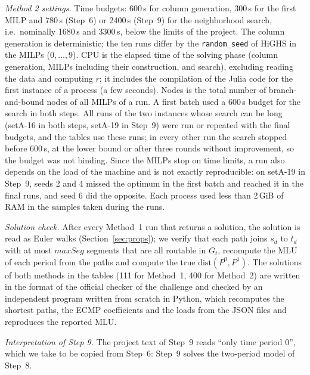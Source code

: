 \documentclass[conference]{IEEEtran}
\begin{document}
\emph{Method 2 settings.} Time budgets: 600\,s for column generation, 300\,s for the first MILP and 780\,s (Step~6) or 2400\,s (Step~9) for the neighborhood search, i.e.\ nominally 1680\,s and 3300\,s, below the limits of the project. The column generation is deterministic; the ten runs differ by the \texttt{random\_seed} of HiGHS in the MILPs ($0,\dots,9$). CPU is the elapsed time of the solving phase (column generation, MILPs including their construction, and search), excluding reading the data and computing $r$; it includes the compilation of the Julia code for the first instance of a process (a few seconds). Nodes is the total number of branch-and-bound nodes of all MILPs of a run. A first batch used a 600\,s budget for the search in both steps. All runs of the two instances whose search can be long (setA-16 in both steps, setA-19 in Step~9) were run or repeated with the final budgets, and the tables use these runs; in every other run the search stopped before 600\,s, at the lower bound or after three rounds without improvement, so the budget was not binding. Since the MILPs stop on time limits, a run also depends on the load of the machine and is not exactly reproducible: on setA-19 in Step~9, seeds 2 and 4 missed the optimum in the first batch and reached it in the final runs, and seed 6 did the opposite. Each process used less than 2\,GiB of RAM in the samples taken during the runs.

\emph{Solution check.} After every Method~1 run that returns a solution, the solution is read as Euler walks (Section~\ref{sec:props}); we verify that each path joins $s_d$ to $t_d$ with at most $maxSeg$ segments that are all routable in $G_t$, recompute the MLU of each period from the paths and compute the true $\mathrm{dist}(P^0,P^1)$. The solutions of both methods in the tables (111 for Method~1, 400 for Method~2) are written in the format of the official checker of the challenge and checked by an independent program written from scratch in Python, which recomputes the shortest paths, the ECMP coefficients and the loads from the JSON files and reproduces the reported MLU.

\emph{Interpretation of Step 9.} The project text of Step~9 reads ``only time period 0'', which we take to be copied from Step~6: Step~9 solves the two-period model of Step~8.
\end{document}
